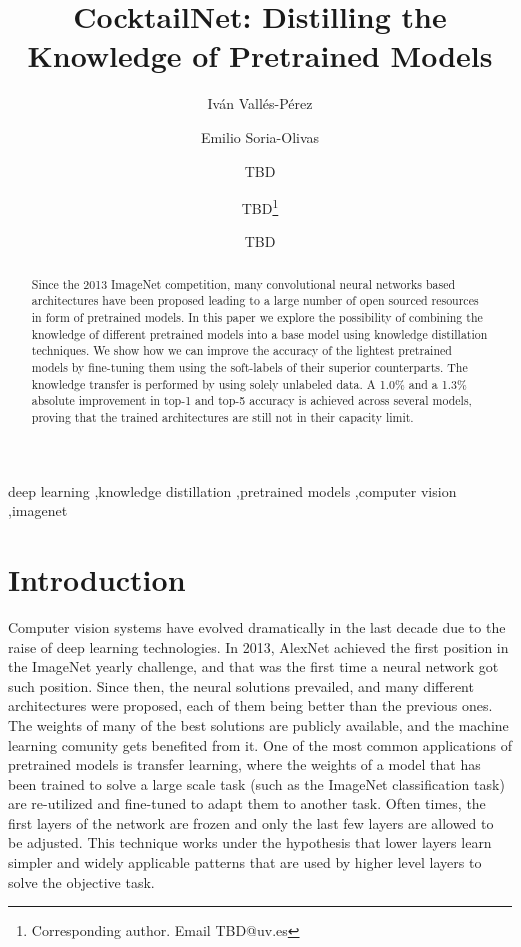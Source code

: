 \documentclass{elsarticle}
\begin{document}
	\begin{frontmatter}
		\title{CocktailNet: Distilling the Knowledge of Pretrained Models}
		\author[UV]{Iván Vallés-Pérez}
		\author[UV]{Emilio Soria-Olivas}
		\author[UV]{TBD}
		\author[UV]{TBD\footnote{Corresponding author. Email TBD@uv.es}}
		\author[UV]{TBD}
		\address[UV]{Escola Tècnica Superior d\textsc{}Enginyeria, University of Valencia, Avenida de la Universitat s/n 46100 Burjassot, Valencia, Spain}

		\begin{abstract}
		Since the 2013 ImageNet competition, many convolutional neural networks based architectures have been proposed leading to a large number of open sourced resources in form of pretrained models. In this paper we explore the possibility of combining the knowledge of different pretrained models into a base model using knowledge distillation techniques. We show how we can improve the accuracy of the lightest pretrained models by fine-tuning them using the soft-labels of their superior counterparts. The knowledge transfer is performed by using solely unlabeled data. A 1.0\% and a 1.3\% absolute improvement in top-1 and top-5 accuracy is achieved across several models, proving that the trained architectures are still not in their capacity limit.
		\end{abstract}
		
		\begin{keyword}
			deep learning \sep knowledge distillation \sep pretrained models \sep computer vision \sep imagenet 
		\end{keyword}
		
	\end{frontmatter}
	
	\linenumbers
	
	\section{Introduction}
	Computer vision systems have evolved dramatically in the last decade due to the raise of deep learning technologies. In 2013, AlexNet achieved the first position in the ImageNet yearly challenge, and that was the first time a neural network got such position. Since then, the neural solutions prevailed, and many different architectures were proposed, each of them being better than the previous ones. The weights of many of the best solutions are publicly available, and the machine learning comunity gets benefited from it. One of the most common applications of pretrained models is transfer learning, where the weights of a model that has been trained to solve a large scale task (such as the ImageNet classification task) are re-utilized and fine-tuned to adapt them to another task. Often times, the first layers of the network are frozen and only the last few layers are allowed to be adjusted. This technique works under the hypothesis that lower layers learn simpler and widely applicable patterns that are used by higher level layers to solve the objective task.	
	
\end{document}
